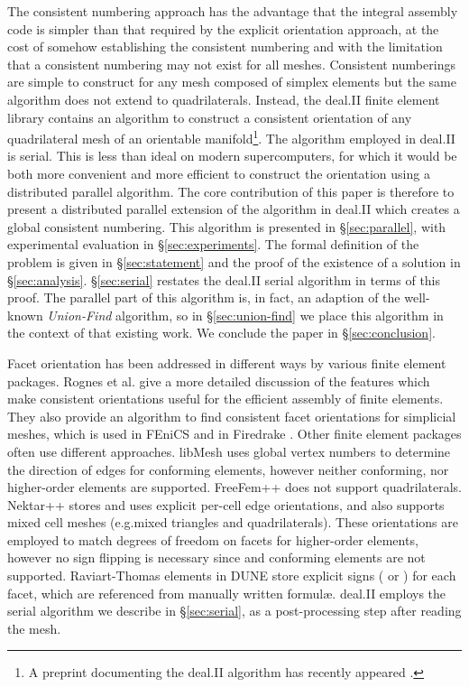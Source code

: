 \documentclass[oneeqnum,onethmnum,onefignum,onetabnum]{siamltex1213}
\newcommand{\Hdiv}{}
\newcommand{\Hcurl}{}
\begin{document}
The consistent numbering approach has the advantage that the integral
assembly code is simpler than that required by the explicit orientation
approach, at the cost of somehow establishing the consistent numbering and
with the limitation that a consistent numbering may not exist for all
meshes. Consistent numberings are simple to construct for any mesh composed
of simplex elements \cite{Rognes2012} but the same algorithm does not extend
to quadrilaterals.  Instead, the deal.II finite element library
\cite{Bangerth2007} contains an algorithm to construct a consistent
orientation of any quadrilateral mesh of an orientable
manifold\footnote{A preprint documenting the deal.II algorithm has
recently appeared \cite{agelek2015}.}.  The
algorithm employed in deal.II is serial. This is less than ideal on modern
supercomputers, for which it would be both more convenient and more
efficient to construct the orientation using a distributed parallel
algorithm. The core contribution of this paper is therefore to present a
distributed parallel extension of the algorithm in deal.II which creates a
global consistent numbering.  This algorithm is presented in
\S\ref{sec:parallel}, with experimental evaluation in \S\ref{sec:experiments}.
The formal definition of the problem is given in \S\ref{sec:statement}
and the proof of the existence of a solution in \S\ref{sec:analysis}.
\S\ref{sec:serial} restates the deal.II serial algorithm in terms of
this proof.  The parallel part of this
algorithm is, in fact, an adaption of the well-known \emph{Union-Find}
algorithm, so in \S\ref{sec:union-find} we place this algorithm in the context
of that existing work.  We conclude the paper in \S\ref{sec:conclusion}.

Facet orientation has been addressed in different ways by various finite
element packages. Rognes et al.\@ \cite{Rognes2012} give a more detailed
discussion of the features which make consistent orientations useful for
the efficient assembly of finite elements. They also provide an algorithm to
find consistent facet orientations for simplicial meshes, which is used in
FEniCS \cite{Hoffman2006} and in Firedrake \cite{Rathgeber2015}.  Other
finite element packages often use different approaches.  libMesh
\cite{Kirk2006} uses global vertex numbers to determine the direction of
edges for \Hcurl{} conforming elements, however neither \Hdiv{} conforming,
nor higher-order elements are supported.  FreeFem++ \cite{Hecht2012} does
not support quadrilaterals.  Nektar++ \cite{Cantwell2015} stores and uses
explicit per-cell edge orientations, and also supports mixed cell meshes
(e.g.\@ mixed triangles and quadrilaterals).  These orientations are
employed to match degrees of freedom on facets for higher-order elements,
however no sign flipping is necessary since \Hdiv{} and \Hcurl{} conforming
elements are not supported.  Raviart-Thomas elements in DUNE
\cite{Bastian2006} store explicit signs ( or ) for each facet, which
are referenced from manually written formul\ae.  deal.II \cite{Bangerth2007}
employs the serial algorithm we describe in \S\ref{sec:serial}, as a
post-processing step after reading the mesh.
\end{document}
